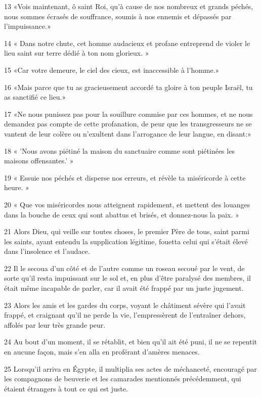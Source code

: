 \par 13 «Vois maintenant, ô saint Roi, qu'à cause de nos nombreux et grands péchés, nous sommes écrasés de souffrance, soumis à nos ennemis et dépassés par l'impuissance.»
\par 14 « Dans notre chute, cet homme audacieux et profane entreprend de violer le lieu saint sur terre dédié à ton nom glorieux. »
\par 15 «Car votre demeure, le ciel des cieux, est inaccessible à l'homme.»
\par 16 «Mais parce que tu as gracieusement accordé ta gloire à ton peuple Israël, tu as sanctifié ce lieu.»
\par 17 «Ne nous punissez pas pour la souillure commise par ces hommes, et ne nous demandez pas compte de cette profanation, de peur que les transgresseurs ne se vantent de leur colère ou n'exultent dans l'arrogance de leur langue, en disant:»
\par 18 « 'Nous avons piétiné la maison du sanctuaire comme sont piétinées les maisons offensantes.' »
\par 19 « Essuie nos péchés et disperse nos erreurs, et révèle ta miséricorde à cette heure. »
\par 20 « Que vos miséricordes nous atteignent rapidement, et mettent des louanges dans la bouche de ceux qui sont abattus et brisés, et donnez-nous la paix. »
\par 21 Alors Dieu, qui veille sur toutes choses, le premier Père de tous, saint parmi les saints, ayant entendu la supplication légitime, fouetta celui qui s'était élevé dans l'insolence et l'audace.
\par 22 Il le secoua d'un côté et de l'autre comme un roseau secoué par le vent, de sorte qu'il resta impuissant sur le sol et, en plus d'être paralysé des membres, il était même incapable de parler, car il avait été frappé par un juste jugement.
\par 23 Alors les amis et les gardes du corps, voyant le châtiment sévère qui l'avait frappé, et craignant qu'il ne perde la vie, l'empressèrent de l'entraîner dehors, affolés par leur très grande peur.
\par 24 Au bout d'un moment, il se rétablit, et bien qu'il ait été puni, il ne se repentit en aucune façon, mais s'en alla en proférant d'amères menaces.
\par 25 Lorsqu'il arriva en Égypte, il multiplia ses actes de méchanceté, encouragé par les compagnons de beuverie et les camarades mentionnés précédemment, qui étaient étrangers à tout ce qui est juste.
